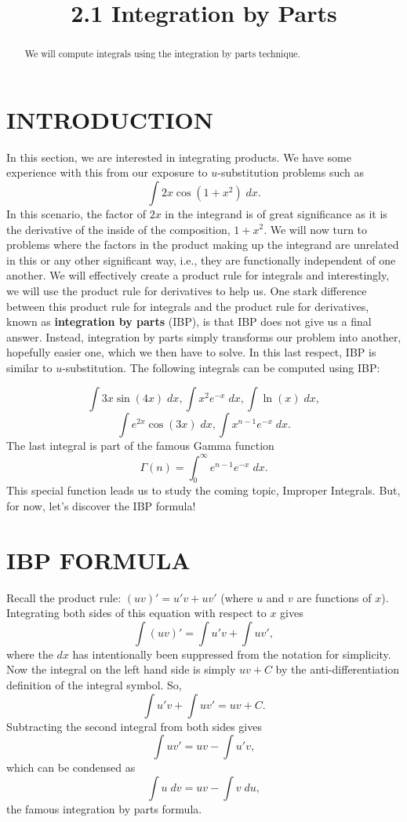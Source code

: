 \documentclass{ximera}
\title{2.1 Integration by Parts}
\begin{document}
\begin{abstract}
We will compute integrals using the integration by parts technique.
\end{abstract}

\maketitle

\section{INTRODUCTION}
In this section, we are interested in integrating products.  
We have some experience with this from our exposure to $u$-substitution problems such as
\[
\int 2x \cos(1 + x^2) \; dx.
\]
In this scenario, the factor of $2x$ in the integrand is of great significance 
as it is the derivative of the inside of the composition, $1 + x^2$.
We will now turn to problems where the factors in the product making up the integrand
are unrelated in this or any other significant way, i.e., they are functionally independent of one another.
We will effectively create a product rule for integrals and interestingly, we will 
use the product rule for derivatives to help us. One stark difference between this product rule for
integrals and the product rule for derivatives, known as \textbf{integration by parts} (IBP), is that IBP does not give us a final answer. Instead, integration by parts
simply transforms our problem into another, hopefully easier one, which we then have to solve.
In this last respect, IBP is similar to $u$-substitution. The following integrals can be computed using IBP:

\[
\int 3x\sin(4x) \; dx, \int x^2 e^{-x} \; dx, \int \ln(x) \; dx,
\]
\[
\int e^{2x}\cos(3x) \; dx, \int x^{n-1} e^{-x} \; dx.
\]
The last integral is part of the famous Gamma function
\[
\Gamma(n) = \int_0^\infty e^{n-1} e^{-x} \; dx.
\]
This special function leads us to study the coming topic, Improper Integrals.
But, for now, let's discover the IBP formula! 


\section{IBP FORMULA}

Recall the product rule: $(uv)' = u'v+uv'$ (where $u$ and $v$ are functions of $x$).
Integrating both sides of this equation with respect to $x$ gives
\[
\int (uv)' = \int u'v + \int uv',
\]
where the $dx$ has intentionally been suppressed from the notation for simplicity.
Now the integral on the left hand side is simply $uv + C$ by the anti-differentiation
definition of the integral symbol. So,
\[
\int u'v + \int uv' = uv + C.
\]
Subtracting the second integral from both sides gives
\[
\int uv' = uv - \int u'v,
\]
which can be condensed as
\[
\int u \; dv = uv - \int v \; du,
\]
the famous integration by parts formula.
\end{document}
